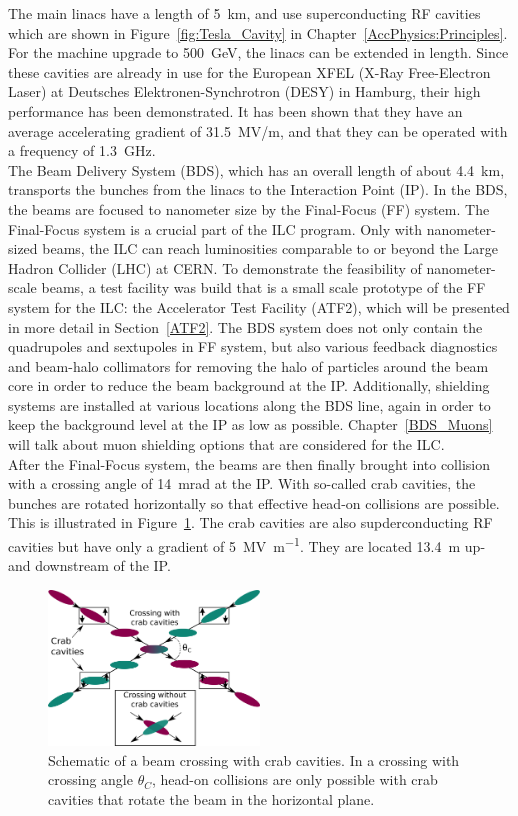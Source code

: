 The main linacs have a length of \SI{5}{\kilo\meter}, and use superconducting RF cavities which are shown in Figure~\ref{fig:Tesla_Cavity} in Chapter~\ref{AccPhysics:Principles}. 
For the machine upgrade to \SI{500}{\GeV}, the linacs can be extended in length.
Since these cavities are already in use for the European XFEL (X-Ray Free-Electron Laser) at Deutsches Elektronen-Synchrotron (DESY) in Hamburg, their high performance has been demonstrated.
It has been shown that they have an average accelerating gradient of \SI{31.5}{MV/m}, and that they can be operated with a frequency of \SI{1.3}{\giga\hertz}.~\cite{Walker}\\
The Beam Delivery System (BDS), which has an overall length of about \SI{4.4}{\kilo\meter}, transports the bunches from the linacs to the Interaction Point (IP).
In the BDS, the beams are focused to nanometer size by the Final-Focus (FF) system.
The Final-Focus system is a crucial part of the ILC program.
Only with nanometer-sized beams, the ILC can reach luminosities comparable to or beyond the Large Hadron Collider (LHC) at CERN.
To demonstrate the feasibility of nanometer-scale beams, a test facility was build that is a small scale prototype of the FF system for the ILC: the Accelerator Test Facility (ATF2), which will be presented in more detail in Section~\ref{ATF2}.
The BDS system does not only contain the quadrupoles and sextupoles in FF system, but also various feedback diagnostics and beam-halo collimators for removing the halo of particles around the beam core in order to reduce the beam background at the IP. 
Additionally, shielding systems are installed at various locations along the BDS line, again in order to keep the background level at the IP as low as possible.
Chapter~\ref{BDS_Muons} will talk about muon shielding options that are considered for the ILC.
\\After the Final-Focus system, the beams are then finally brought into collision with a crossing angle of \SI{14}{mrad} at the IP.\cite[p. 9-10]{TDR1}
With so-called crab cavities, the bunches are rotated horizontally so that effective head-on collisions are possible.
This is illustrated in Figure~\ref{fig:Crab_crossing}.
The crab cavities are also supderconducting RF cavities but have only a gradient of \SI{5}{\mega\volt\per\meter}.
They are located \SI{13.4}{\meter} up- and downstream of the IP.~\cite[p. 154]{TDR32}
\begin{figure}
\centering
\includegraphics[width=0.5\textwidth]{Figures/Crab_crossing.png}
\caption[Schematic of a beam crossing with crab cavities]{Schematic of a beam crossing with crab cavities. In a crossing with crossing angle $\theta_C$, head-on collisions are only possible with crab cavities that rotate the beam in the horizontal plane.}
\label{fig:Crab_crossing}
\end{figure}
